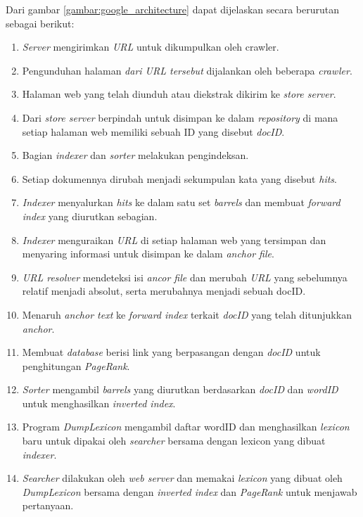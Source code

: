 Dari gambar \ref{gambar:google_architecture} dapat dijelaskan secara berurutan sebagai berikut:
\begin{enumerate}
	\item \textit{Server} mengirimkan \textit{URL} untuk dikumpulkan oleh crawler.
	\item Pengunduhan halaman \textit{dari URL tersebut} dijalankan oleh beberapa \textit{crawler}.
	\item Halaman web yang telah diunduh atau diekstrak dikirim ke \textit{store server}.
	\item Dari \textit{store server} berpindah untuk disimpan ke dalam \textit{repository} di mana setiap halaman web memiliki sebuah ID yang disebut \textit{docID}.
	\item Bagian \textit{indexer} dan \textit{sorter} melakukan pengindeksan.
	\item Setiap dokumennya dirubah menjadi sekumpulan kata yang disebut \textit{hits}.
	\item \textit{Indexer} menyalurkan \textit{hits} ke dalam satu set \textit{barrels} dan membuat \textit{forward index} yang diurutkan sebagian.
	\item \textit{Indexer} menguraikan \textit{URL} di setiap halaman web yang tersimpan dan menyaring informasi untuk disimpan ke dalam \textit{anchor file}.
	\item \textit{URL resolver} mendeteksi isi \textit{ancor file} dan merubah \textit{URL} yang sebelumnya relatif menjadi absolut, serta merubahnya menjadi sebuah docID.
	\item Menaruh \textit{anchor text} ke \textit{forward index} terkait \textit{docID} yang telah ditunjukkan \textit{anchor}.
	\item Membuat \textit{database} berisi link yang berpasangan dengan \textit{docID} untuk penghitungan \textit{PageRank}.
	\item \textit{Sorter} mengambil \textit{barrels} yang diurutkan berdasarkan \textit{docID} dan \textit{wordID} untuk menghasilkan \textit{inverted index}.
	\item Program \textit{DumpLexicon} mengambil daftar wordID dan menghasilkan \textit{lexicon} baru untuk dipakai oleh \textit{searcher} bersama dengan lexicon yang dibuat \textit{indexer}.
	\item \textit{Searcher} dilakukan oleh \textit{web server} dan memakai \textit{lexicon} yang dibuat oleh \textit{DumpLexicon} bersama dengan \textit{inverted index} dan \textit{PageRank} untuk menjawab pertanyaan.
\end{enumerate}

